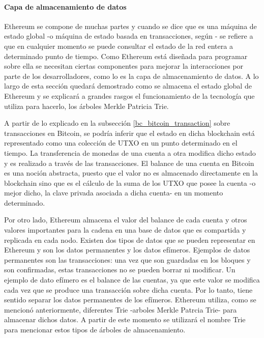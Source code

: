 \paragraph{Capa de almacenamiento de datos}
\label{bc_ethereum_data_layer}

Ethereum se compone de muchas partes y cuando se dice que es una máquina de estado global -o máquina de estado basada en transacciones, según \cite{wood2014ethereum}- se refiere a que en cualquier momento se puede consultar el estado de la red entera a determinado punto de tiempo. Como Ethereum está diseñada para programar sobre ella se necesitan ciertas componentes para mejorar la interacciones por parte de los desarrolladores, como lo es la capa de almacenamiento de datos. A lo largo de esta sección quedará demostrado como se almacena el estado global de Ethereum y se explicará a grandes rasgos el funcionamiento de la tecnología que utiliza para hacerlo, los árboles Merkle Patricia Trie.

A partir de lo explicado en la subsección \ref{bc_bitcoin_transaction} sobre transacciones en Bitcoin, se podría inferir que el estado en dicha blockchain está representado como una colección de UTXO en un punto determinado en el tiempo. La transferencia de monedas de una cuenta a otra modifica dicho estado y es realizado a través de las transacciones. El balance de una cuenta en Bitcoin es una noción abstracta, puesto que el valor no es almacenado directamente en la blockchain sino que es el cálculo de la suma de los UTXO que posee la cuenta -o mejor dicho, la clave privada asociada a dicha cuenta- en un momento determinado.

Por otro lado, Ethereum almacena el valor del balance de cada cuenta y otros valores importantes para la cadena en una base de datos que es compartida y replicada en cada nodo. Existen dos tipos de datos que se pueden representar en Ethereum y son los datos permanentes y los datos efímeros. Ejemplos de datos permanentes son las transacciones: una vez que son guardadas en los bloques y son confirmadas, estas transacciones no se pueden borrar ni modificar. Un ejemplo de dato efímero es el balance de las cuentas, ya que este valor se modifica cada vez que se produce una transacción sobre dicha cuenta. Por lo tanto, tiene sentido separar los datos permanentes de los efímeros. Ethereum utiliza, como se mencionó anteriormente, diferentes Trie -arboles Merkle Patrcia Trie- para almacenar dichos datos. A partir de este momento se utilizará el nombre Trie para mencionar estos tipos de árboles de almacenamiento.

